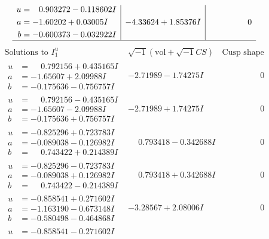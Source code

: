 \documentclass[1p]{elsarticle_modified}
\theoremstyle{definition}
\newcommand{\I}{\sqrt{-1}}
\begin{document}
$$\begin{array}{c|c|c}
\begin{aligned}
u &= \phantom{-}0.903272 - 0.118602 I \\
a &= -1.60202 + 0.03005 I \\
b &= -0.600373 - 0.032922 I\end{aligned}
 & -4.33624 + 1.85376 I & \phantom{-0.000000 } 0\\
 \hline 
 \end{array}$$\newpage$$\begin{array}{c|c|c}  
\text{Solutions to }I^u_{1}& \I (\text{vol} + \sqrt{-1}CS) & \text{Cusp shape}\\
 \hline 
\begin{aligned}
u &= \phantom{-}0.792156 + 0.435165 I \\
a &= -1.65607 + 2.09988 I \\
b &= -0.175636 - 0.756757 I\end{aligned}
 & -2.71989 - 1.74275 I & \phantom{-0.000000 } 0 \\ \hline\begin{aligned}
u &= \phantom{-}0.792156 - 0.435165 I \\
a &= -1.65607 - 2.09988 I \\
b &= -0.175636 + 0.756757 I\end{aligned}
 & -2.71989 + 1.74275 I & \phantom{-0.000000 } 0 \\ \hline\begin{aligned}
u &= -0.825296 + 0.723783 I \\
a &= -0.089038 - 0.126982 I \\
b &= \phantom{-}0.743422 + 0.214389 I\end{aligned}
 & \phantom{-}0.793418 - 0.342688 I & \phantom{-0.000000 } 0 \\ \hline\begin{aligned}
u &= -0.825296 - 0.723783 I \\
a &= -0.089038 + 0.126982 I \\
b &= \phantom{-}0.743422 - 0.214389 I\end{aligned}
 & \phantom{-}0.793418 + 0.342688 I & \phantom{-0.000000 } 0 \\ \hline\begin{aligned}
u &= -0.858541 + 0.271602 I \\
a &= -1.163190 - 0.673148 I \\
b &= -0.580498 - 0.464868 I\end{aligned}
 & -3.28567 + 2.08006 I & \phantom{-0.000000 } 0 \\ \hline\begin{aligned}
u &= -0.858541 - 0.271602 I \\

\end{aligned}
\end{array}$$
\end{document}
